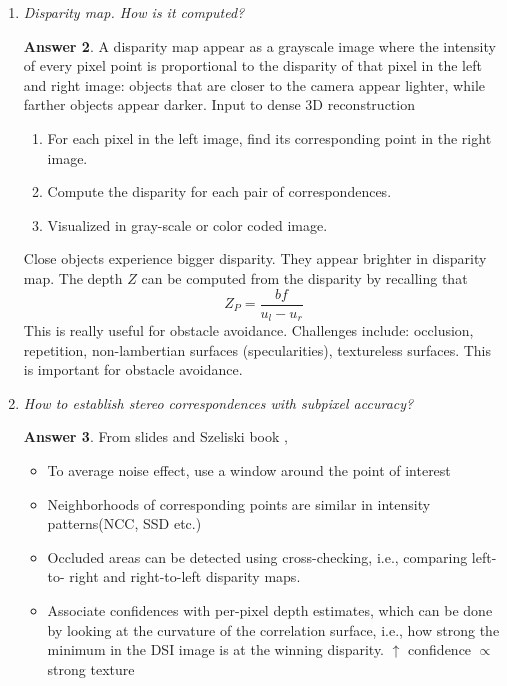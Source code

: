 \documentclass[a4paper,12 pt]{article}
\theoremstyle{definition}
\theoremstyle{remark}
\theoremstyle{definition}
\theoremstyle{definition}
\theoremstyle{definition}
\theoremstyle{definition}
\theoremstyle{remark}
\theoremstyle{remark}
\theoremstyle{definition}
\theoremstyle{definition}
\newtheorem*{answer}{Answer}
\begin{document}
\begin{enumerate}
\begin{answer}
\end{answer}
\item \textit{Disparity map. How is it computed?}
\begin{answer}
A disparity map appear as a grayscale image where the intensity of every pixel point is proportional to the disparity of that pixel in the left and right image: objects that are closer to the camera appear lighter, while farther objects appear darker.
Input to dense 3D reconstruction
\begin{enumerate}
\item For each pixel in the left image, find its corresponding point in the right image.
\item Compute the disparity for each pair of correspondences.
\item Visualized in gray-scale or color coded image.
\end{enumerate}
Close objects experience bigger disparity. They appear brighter in disparity map.
The depth $Z$ can be computed from the disparity by recalling that
\begin{equation}
Z_P=\frac{bf}{u_l-u_r}
\end{equation}
This is really useful for obstacle avoidance.
Challenges include: occlusion, repetition, non-lambertian surfaces (specularities), textureless surfaces. This is important for obstacle avoidance.
\end{answer}
\item \textit{How to establish stereo correspondences with subpixel accuracy?}
\begin{answer}
From slides and Szeliski book , 
\begin{itemize}
\item To average noise effect, use a window around the point of interest
\item Neighborhoods of corresponding points are similar in intensity patterns(NCC, SSD etc.)
\item Occluded areas can be detected using cross-checking, i.e., comparing left-to- right and right-to-left disparity maps.
\item Associate confidences with per-pixel depth estimates, which can be done by looking at the curvature of the correlation surface, i.e., how strong the minimum in the DSI image is at the winning disparity. $\uparrow$ confidence $\propto$ strong texture 
\end{itemize}


\end{answer}
\end{enumerate}
\end{document}
